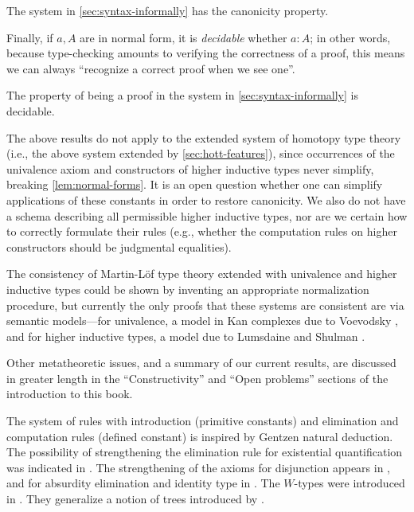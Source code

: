 \begin{cor}
 The system in \cref{sec:syntax-informally} has the canonicity property.
\end{cor}

Finally, if $a,A$ are in normal form, it is \emph{decidable} whether $a:A$; in
other words, because type-checking amounts to verifying the correctness of a
proof, this means we can always ``recognize a correct proof when we see one''.

\begin{cor}
The property of being a proof in the system in \cref{sec:syntax-informally} is decidable.
\end{cor}

\mentalpause

The above results do not apply to the extended system of homotopy type
theory (i.e., the above system extended by \cref{sec:hott-features}), since
occurrences of the univalence axiom and constructors of higher inductive types
never simplify, breaking \cref{lem:normal-forms}. It is an open question
whether one can simplify applications of these constants in order to restore
canonicity. We also do not have a schema describing all permissible higher
inductive types, nor are we certain how to correctly formulate their rules
(e.g., whether the computation rules on higher constructors should be judgmental
equalities).

The consistency of Martin-L\"{o}f type theory extended with univalence and higher
inductive types could be shown by inventing an appropriate normalization procedure, but currently
the only proofs that these systems are consistent are via semantic models---for
univalence, a model in Kan complexes due to Voevodsky \cite{klv:ssetmodel}, and
for higher inductive types, a model due to Lumsdaine and Shulman \cite{ls:hits}.

Other metatheoretic issues, and a summary of our current results, are discussed
in greater length in the ``Constructivity'' and ``Open problems'' sections of
the introduction to this book.

%

\sectionNotes\label{subsec:general-remarks}


The system of rules with introduction (primitive constants) and elimination
and computation rules (defined constant) is inspired by Gentzen natural
deduction. The possibility of strengthening the elimination rule for
existential quantification was indicated in \cite{howard:pat}. The
strengthening of the axioms for disjunction appears in \cite{Martin-Lof-1972},
and for absurdity elimination and identity type in \cite{Martin-Lof-1973}. The
$W$-types were introduced in \cite{Martin-Lof-1979}. They generalize a notion
of trees introduced by \cite{Tait-1968}.
%

